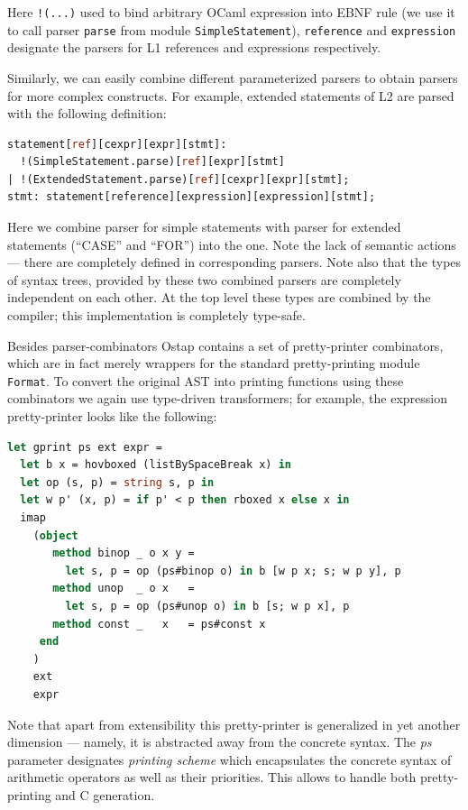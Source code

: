 Here \lstinline{!(...)} used to bind arbitrary OCaml expression into EBNF rule (we use it
to call parser \lstinline{parse} from module \lstinline{SimpleStatement}), \lstinline{reference} and
\lstinline{expression} designate the parsers for L1 references and expressions respectively.

Similarly, we can easily combine different parameterized parsers to obtain parsers for more
complex constructs. For example, extended statements of L2 are parsed with the following
definition:

\begin{lstlisting}[language=ocaml]
statement[ref][cexpr][expr][stmt]: 
  !(SimpleStatement.parse)[ref][expr][stmt]
| !(ExtendedStatement.parse)[ref][cexpr][expr][stmt];
stmt: statement[reference][expression][expression][stmt];
\end{lstlisting}

Here we combine parser for simple statements with parser for extended statements (``CASE'' and ``FOR'')
into the one. Note the lack of semantic actions --- there are completely defined in corresponding
parsers. Note also that the types of syntax trees, provided by these two combined parsers are completely 
independent on each other. At the top level these types are combined by the compiler; this implementation 
is completely type-safe.

Besides parser-combinators Ostap contains a set of pretty-printer combinators, which are
in fact merely wrappers for the standard pretty-printing module \lstinline{Format}. To
convert the original AST into printing functions using these combinators we again
use type-driven transformers; for example, the expression pretty-printer looks like
the following:

\begin{lstlisting}[language=ocaml]
let gprint ps ext expr =
  let b x = hovboxed (listBySpaceBreak x) in
  let op (s, p) = string s, p in
  let w p' (x, p) = if p' < p then rboxed x else x in 
  imap  
    (object 
       method binop _ o x y = 
         let s, p = op (ps#binop o) in b [w p x; s; w p y], p
       method unop  _ o x   = 
         let s, p = op (ps#unop o) in b [s; w p x], p
       method const _   x   = ps#const x
     end
    )
    ext
    expr
\end{lstlisting}

Note that apart from extensibility this pretty-printer is generalized in yet another 
dimension --- namely, it is abstracted away from the concrete syntax. The \emph{ps}
parameter designates \emph{printing scheme} which encapsulates the concrete
syntax of arithmetic operators as well as their priorities. This allows to handle
both pretty-printing and C generation.

